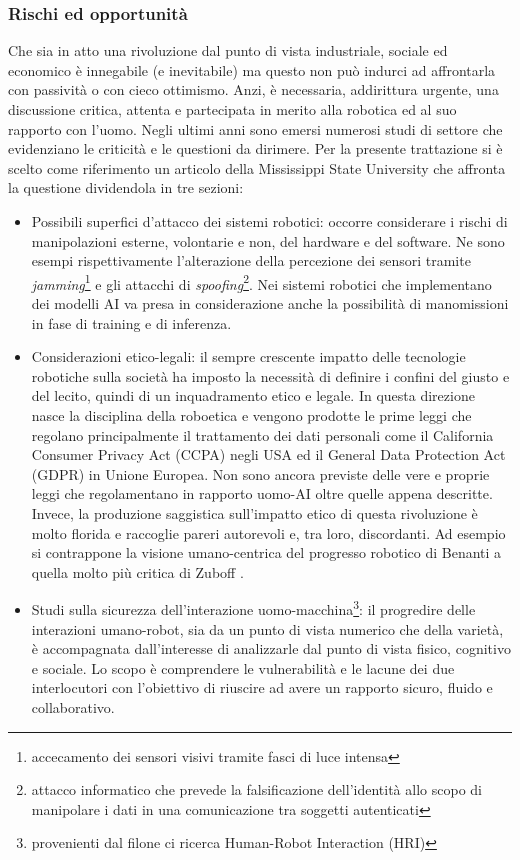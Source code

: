 \subsubsection{Rischi ed opportunità}
Che sia in atto una rivoluzione dal punto di vista industriale, sociale ed economico è innegabile (e inevitabile) ma questo non può indurci ad affrontarla con passività o con cieco ottimismo. Anzi, è necessaria, addirittura urgente, una discussione critica, attenta e partecipata in merito alla robotica ed al suo rapporto con l'uomo. Negli ultimi anni sono emersi numerosi studi di settore che evidenziano le criticità e le questioni da dirimere. Per la presente trattazione si è scelto come riferimento un articolo della Mississippi State University \cite{neupane2024security} che affronta la questione dividendola in tre sezioni:
\begin{itemize}
    \item Possibili superfici d'attacco dei sistemi robotici: occorre considerare i rischi di manipolazioni esterne, volontarie e non, del hardware e del software. Ne sono esempi rispettivamente l'alterazione della percezione dei sensori tramite \textit{jamming}\footnote{accecamento dei sensori visivi tramite fasci di luce intensa} e gli attacchi di \textit{spoofing}\footnote{attacco informatico che prevede la falsificazione dell'identità allo scopo di manipolare i dati in una comunicazione tra soggetti autenticati}. Nei sistemi robotici che implementano dei modelli AI va presa in considerazione anche la possibilità di manomissioni in fase di training e di inferenza.
    \item Considerazioni etico-legali: il sempre crescente impatto delle tecnologie robotiche sulla società ha imposto la necessità di definire i confini del giusto e del lecito, quindi di un inquadramento etico e legale. In questa direzione nasce la disciplina della roboetica e vengono prodotte le prime leggi che regolano principalmente il trattamento dei dati personali come il California Consumer Privacy Act (CCPA) negli USA ed il General Data Protection Act (GDPR) in Unione Europea. Non sono ancora previste delle vere e proprie leggi che regolamentano in rapporto uomo-AI oltre quelle appena descritte. Invece, la produzione saggistica sull'impatto etico di questa rivoluzione è molto florida e raccoglie pareri autorevoli e, tra loro, discordanti. Ad esempio si contrappone la visione umano-centrica del progresso robotico di Benanti \cite{BenantiMaffettone2024} a quella molto più critica di Zuboff \cite{Zuboff2019}.
    \item Studi sulla sicurezza dell'interazione uomo-macchina\footnote{provenienti dal filone ci ricerca Human-Robot Interaction (HRI)}: il progredire delle interazioni umano-robot, sia da un punto di vista numerico che della varietà, è accompagnata dall'interesse di analizzarle dal punto di vista fisico, cognitivo e sociale. Lo scopo è comprendere le vulnerabilità e le lacune dei due interlocutori con l'obiettivo di riuscire ad avere un rapporto sicuro, fluido e collaborativo. 
\end{itemize}

